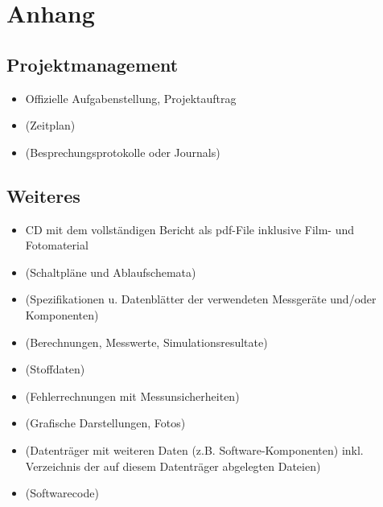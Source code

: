 %
%



\appendix
\chapter{Anhang}\label{chap.anhang}



\section{Projektmanagement}\label{sec.projektmanagement}

\begin{itemize}
\item Offizielle Aufgabenstellung, Projektauftrag
\item (Zeitplan)
\item (Besprechungsprotokolle oder Journals)
\end{itemize}



\section{Weiteres}\label{weiteres}

\begin{itemize}
\item CD mit dem vollständigen Bericht als pdf-File inklusive Film- und Fotomaterial
\item (Schaltpläne und Ablaufschemata)
\item (Spezifikationen u. Datenblätter der verwendeten Messgeräte und/oder Komponenten)
\item (Berechnungen, Messwerte, Simulationsresultate)
\item (Stoffdaten)
\item (Fehlerrechnungen mit Messunsicherheiten)
\item (Grafische Darstellungen, Fotos)
\item (Datenträger mit weiteren Daten (z.B. Software-Komponenten) inkl. Verzeichnis der auf diesem Datenträger abgelegten Dateien)
\item (Softwarecode)
\end{itemize}
